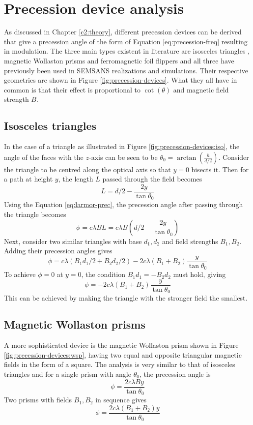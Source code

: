 \section{Precession device analysis}
\label{c3.3}
As discussed in Chapter \ref{c2:theory}, different precession devices can be derived that give a precession angle of the form of Equation \eqref{eq:precession-freq} resulting in modulation. The three main types existent in literature are isosceles triangles \cite{sales2015}, magnetic Wollaston prisms \cite{li2021} and ferromagnetic foil flippers \cite{bouwman2021b} and all three have previously been used in SEMSANS realizations and simulations. Their respective geometries are shown in Figure \ref{fig:precession-devices}. What they all have in common is that their effect is proportional to $\cot(\theta)$ and magnetic field strength $B$.
\subsection{Isosceles triangles}
In the case of a triangle as illustrated in Figure \ref{fig:precession-devices:iso}, the angle of the faces with the $z$-axis can be seen to be $\theta_0 = \arctan\left(\frac{h}{d/2}\right)$. Consider the triangle to be centred along the optical axis so that $y=0$ bisects it. Then for a path at height $y$, the length $L$ passed through the field becomes
$$L = d/2 - \frac{2y}{\tan\theta_0}$$
Using the Equation \eqref{eq:larmor-prec}, the precession angle after passing through the triangle becomes
$$\phi = c\lambda B L = c\lambda B(d/2 - \frac{2y}{\tan\theta_0})$$
Next, consider two similar triangles with base $d_1, d_2$ and field strengths $B_1, B_2$. Adding their precession angles gives 
$$\phi = c\lambda (B_1d_1/2 +B_2d_2/2) - 2c\lambda (B_1 + B_2) \frac{y}{\tan\theta_0}$$
To achieve $\phi = 0$ at $y=0$, the condition $B_1d_1 = -B_2d_2$ must hold, giving 
$$\phi = -2c\lambda (B_1 + B_2) \frac{y}{\tan\theta_0}$$
This can be achieved by making the triangle with the stronger field the smallest. 

\subsection{Magnetic Wollaston prisms}
A more sophisticated device is the magnetic Wollaston prism shown in Figure \ref{fig:precession-devices:wsp}, having two equal and opposite triangular magnetic fields in the form of a square. The analysis is very similar to that of isosceles triangles and for a single prism with angle $\theta_0$, the precession angle is
$$\phi = \frac{2c\lambda B y}{\tan{\theta_0}}$$
Two prisms with fields $B_1, B_2$ in sequence gives
$$\phi = \frac{2c\lambda (B_1 + B_2) y}{\tan{\theta_0}}$$
